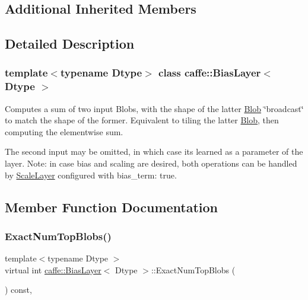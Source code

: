 \subsection*{Additional Inherited Members}


\subsection{Detailed Description}
\subsubsection*{template$<$typename Dtype$>$\newline
class caffe\+::\+Bias\+Layer$<$ Dtype $>$}

Computes a sum of two input Blobs, with the shape of the latter \mbox{\hyperlink{classcaffe_1_1_blob}{Blob}} \char`\"{}broadcast\char`\"{} to match the shape of the former. Equivalent to tiling the latter \mbox{\hyperlink{classcaffe_1_1_blob}{Blob}}, then computing the elementwise sum. 

The second input may be omitted, in which case it\textquotesingle{}s learned as a parameter of the layer. Note\+: in case bias and scaling are desired, both operations can be handled by {\ttfamily \mbox{\hyperlink{classcaffe_1_1_scale_layer}{Scale\+Layer}}} configured with {\ttfamily bias\+\_\+term\+: true}. 

\subsection{Member Function Documentation}
\mbox{\label{classcaffe_1_1_bias_layer_a9552dc137a5bcbdd17bdb3321d678595}} 
\subsubsection{\texorpdfstring{Exact\+Num\+Top\+Blobs()}{ExactNumTopBlobs()}\hspace{0.1cm}{\footnotesize\ttfamily [1/2]}}
{\footnotesize\ttfamily template$<$typename Dtype $>$ \\
virtual int \mbox{\hyperlink{classcaffe_1_1_bias_layer}{caffe\+::\+Bias\+Layer}}$<$ Dtype $>$\+::Exact\+Num\+Top\+Blobs (\begin{DoxyParamCaption}{ }\end{DoxyParamCaption}) const\hspace{0.3cm}{\ttfamily [inline]}, {\ttfamily [virtual]}}



